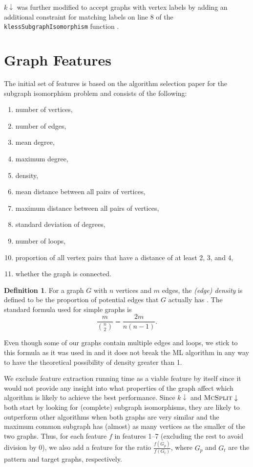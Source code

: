 \documentclass{l4proj}
\theoremstyle{definition}
\newtheorem{definition}{Definition}[section]
\theoremstyle{remark}
\begin{document}
$k\downarrow$ was further modified to accept graphs with vertex labels by adding
an additional constraint for matching labels on line 8 of the
\texttt{klessSubgraphIsomorphism} function \cite{DBLP:conf/aaai/HoffmannMR17}.

\section{Graph Features} \label{sec:features}
The initial set of features is based on the algorithm selection paper for the
subgraph isomorphism problem \cite{DBLP:conf/lion/KotthoffMS16} and consists of
the following:

\begin{enumerate}
\item number of vertices,
\item number of edges,
\item mean degree,
\item maximum degree,
\item density,
\item mean distance between all pairs of vertices,
\item maximum distance between all pairs of vertices,
\item standard deviation of degrees,
\item number of loops,
\item proportion of all vertex pairs that have a distance of at least 2, 3, and 4,
\item whether the graph is connected.
\end{enumerate}

\begin{definition}
For a graph $G$ with $n$ vertices and $m$ edges, the \emph{(edge) density} is
defined to be the proportion of potential edges that $G$ actually has
\cite{DBLP:books/daglib/0030488}. The standard formula used for simple graphs is
\[ \frac{m}{\binom{n}{2}} = \frac{2m}{n(n-1)}. \]
\end{definition}
Even though some of our graphs contain multiple edges and loops, we stick to
this formula as it was used in \cite{DBLP:conf/lion/KotthoffMS16} and it does
not break the ML algorithm in any way to have the theoretical possibility of
density greater than 1.

We exclude feature extraction running time as a viable feature by itself since
it would not provide any insight into what properties of the graph affect which
algorithm is likely to achieve the best performance. Since $k\downarrow$ and
$\textsc{McSplit}\downarrow$ both start by looking for (complete) subgraph
isomorphisms, they are likely to outperform other algorithms when both graphs
are very similar and the maximum common subgraph has (almost) as many vertices
as the smaller of the two graphs. Thus, for each feature $f$ in features 1--7
(excluding the rest to avoid division by 0), we also add a feature for the ratio
$\frac{f(G_p)}{f(G_t)}$, where $G_p$ and $G_t$ are the pattern and target
graphs, respectively.
\end{document}
